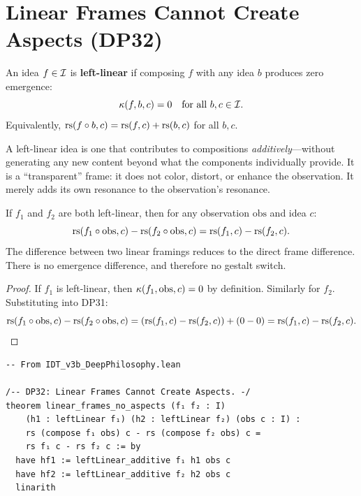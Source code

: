 \section{Linear Frames Cannot Create Aspects (DP32)}

\begin{definition}
\label{def:left-linear}
An idea $f \in \mathcal{I}$ is \textbf{left-linear} if composing $f$ with
any idea $b$ produces zero emergence:
\[
\kappa(f, b, c) = 0 \quad \text{for all } b, c \in \mathcal{I}.
\]
Equivalently, $\mathrm{rs}(f \circ b, c) = \mathrm{rs}(f, c) + \mathrm{rs}(b, c)$ for
all $b, c$.
\end{definition}

A left-linear idea is one that contributes to compositions
\emph{additively}---without generating any new content beyond what the
components individually provide.  It is a ``transparent'' frame: it
does not color, distort, or enhance the observation.  It merely adds
its own resonance to the observation's resonance.

\begin{theorem}
\label{thm:linear-frames-no-aspects}
If $f_1$ and $f_2$ are both left-linear, then for any observation
$\mathrm{obs}$ and idea $c$:
\[
\mathrm{rs}(f_1 \circ \mathrm{obs}, c) - \mathrm{rs}(f_2 \circ \mathrm{obs}, c) =
\mathrm{rs}(f_1, c) - \mathrm{rs}(f_2, c).
\]
The difference between two linear framings reduces to the direct frame
difference.  There is no emergence difference, and therefore no
gestalt switch.
\end{theorem}

\begin{proof}
If $f_1$ is left-linear, then $\kappa(f_1, \mathrm{obs}, c) = 0$
by definition.  Similarly for $f_2$.  Substituting into DP31:
\[
\mathrm{rs}(f_1 \circ \mathrm{obs}, c) - \mathrm{rs}(f_2 \circ \mathrm{obs}, c) =
(\mathrm{rs}(f_1, c) - \mathrm{rs}(f_2, c)) + (0 - 0) = \mathrm{rs}(f_1, c) - \mathrm{rs}(f_2, c).
\]
\end{proof}

\begin{lstlisting}
-- From IDT_v3b_DeepPhilosophy.lean

/-- DP32: Linear Frames Cannot Create Aspects. -/
theorem linear_frames_no_aspects (f₁ f₂ : I)
    (h1 : leftLinear f₁) (h2 : leftLinear f₂) (obs c : I) :
    rs (compose f₁ obs) c - rs (compose f₂ obs) c =
    rs f₁ c - rs f₂ c := by
  have hf1 := leftLinear_additive f₁ h1 obs c
  have hf2 := leftLinear_additive f₂ h2 obs c
  linarith
\end{lstlisting}

